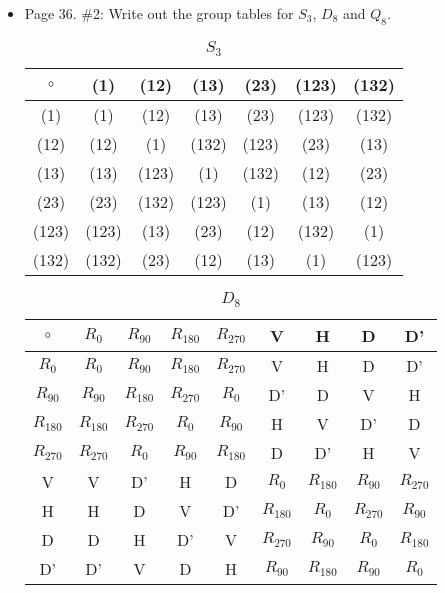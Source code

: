 \documentclass[12pt]{report}
\begin{document}
\begin{itemize}
\item Page 36. \#2: Write out the group tables for $S_3$, $D_8$ and $Q_8$.

\begin{table}[h]
\centering
\caption{$S_3$}
\label{Symmetric}
\begin{tabular}{c|cccccc}
$\circ$ & (1)   & (12)  & (13)  & (23)  & (123) & (132) \\
\hline
(1)     & (1)   & (12)  & (13)  & (23)  & (123) & (132) \\
(12)    & (12)  & (1)   & (132) & (123) & (23)  & (13)  \\
(13)    & (13)  & (123) & (1)   & (132) & (12)  & (23)  \\
(23)    & (23)  & (132) & (123) & (1)   & (13)  & (12)  \\
(123)   & (123) & (13)  & (23)  & (12)  & (132) & (1)   \\
(132)   & (132) & (23)  & (12)  & (13)  & (1)   & (123)
\end{tabular}
\end{table}

\begin{table}[h]
  \centering
\caption{$D_8$}
\label{Dihedral}
\begin{tabular}{c|cccccccc}
$\circ$  &$R_0$    &$R_{90}$ &$R_{180}$&$R_{270}$&V        &H        &D        &D'  \\
\hline
$R_0$    &$R_0$    &$R_{90}$ &$R_{180}$&$R_{270}$&V        &H        &D        &D'  \\
$R_{90}$ &$R_{90}$ &$R_{180}$&$R_{270}$&$R_0$    &D'       &D        &V        &H   \\
$R_{180}$&$R_{180}$&$R_{270}$&$R_0$    &$R_{90}$ &H        &V        &D'       &D   \\
$R_{270}$&$R_{270}$&$R_0$    &$R_{90}$ &$R_{180}$&D        &D'       &H        &V   \\
V        &V        &D'       &H        &D        &$R_0$    &$R_{180}$&$R_{90}$ &$R_{270}$\\
H        &H        &D        &V        &D'       &$R_{180}$&$R_0$    &$R_{270}$&$R_{90}$ \\
D        &D        &H        &D'       &V        &$R_{270}$&$R_{90}$ &$R_0$    &$R_{180}$\\
D'       &D'       &V        &D        &H        &$R_{90}$ &$R_{180}$&$R_{90}$ &$R_0$

\end{tabular}
\end{table}


\end{itemize}
\end{document}
